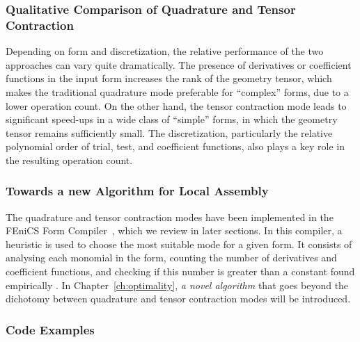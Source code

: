 \subsubsection{Qualitative Comparison of Quadrature and Tensor Contraction}
Depending on form and discretization, the relative performance of the two approaches can vary quite dramatically. The presence of derivatives or coefficient functions in the input form increases the rank of the geometry tensor, which makes the traditional quadrature mode preferable for ``complex'' forms, due to a lower operation count. On the other hand, the tensor contraction mode leads to significant speed-ups in a wide class of ``simple'' forms, in which the geometry tensor remains sufficiently small. The discretization, particularly the relative polynomial order of trial, test, and coefficient functions, also plays a key role in the resulting operation count. 

\subsubsection{Towards a new Algorithm for Local Assembly}
The quadrature and tensor contraction modes have been implemented in the FEniCS Form Compiler~\citep{FFC-TC}, which we review in later sections. In this compiler, a heuristic is used to choose the most suitable mode for a given form. It consists of analysing each monomial in the form, counting the number of derivatives and coefficient functions, and checking if this number is greater than a constant found empirically \citep{Fenics}. In Chapter~\ref{ch:optimality}, {\em a novel algorithm} that goes beyond the dichotomy between quadrature and tensor contraction modes will be introduced. 


\subsubsection{Code Examples}
\label{sec:bkg:mathcode}

